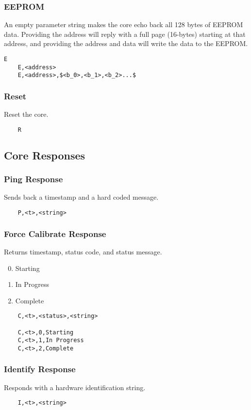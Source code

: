 \documentclass[10pt]{article}
\begin{document}
\subsubsection{EEPROM}
An empty parameter string makes the core echo back all 128 bytes of EEPROM data. Providing the address will reply with a full page (16-bytes) starting at that address, and providing the address and data will write the data to the EEPROM.
\begin{lstlisting}[mathescape=true]
	E
	E,<address>
	E,<address>,$<b_0>,<b_1>,<b_2>...$
\end{lstlisting}

\subsubsection{Reset}
Reset the core.
\begin{lstlisting}
	R
\end{lstlisting}

\subsection{Core Responses}

\subsubsection{Ping Response}
Sends back a timestamp and a hard coded message.
\begin{lstlisting}
	P,<t>,<string>
\end{lstlisting}

\subsubsection{Force Calibrate Response}
Returns timestamp, status code, and status message.
\begin{enumerate}
	\setcounter{enumi}{-1}
	\item Starting
	\item In Progress
	\item Complete
\end{enumerate}
\begin{lstlisting}
	C,<t>,<status>,<string>

	C,<t>,0,Starting
	C,<t>,1,In Progress
	C,<t>,2,Complete
\end{lstlisting}

\subsubsection{Identify Response}
Responds with a hardware identification string.
\begin{lstlisting}
	I,<t>,<string>
\end{lstlisting}
\end{document}
